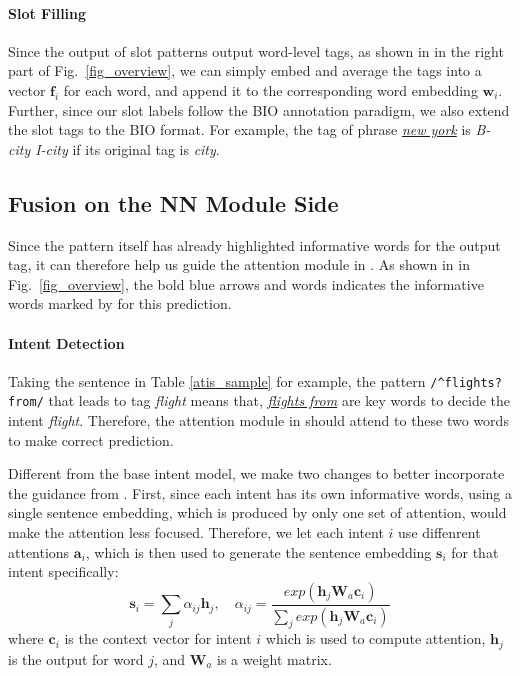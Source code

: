 \paragraph{Slot Filling}
Since the output of slot \RE patterns output word-level tags, as shown in  in the right part of Fig.~\ref{fig_overview}, we can simply embed and average the \RE tags into a vector $\textbf{f}_i$ for each word, and append it to the corresponding word embedding $\textbf{w}_i$. 
Further, since our slot labels follow the BIO annotation paradigm, we also extend the slot \RE tags to the BIO format. For example, the \RE tag of phrase \textsl{\underline{new york}} is \emph{B-city I-city} if its original tag is \emph{city}.

\subsection{Fusion on the NN Module Side}
\label{interact_with_module}
Since the \RE pattern itself has already highlighted informative words for the output tag, it can therefore help us guide the attention module in \NN.
As shown in  in Fig.~\ref{fig_overview}, the bold blue arrows and words indicates the informative words marked by \RE for this prediction.
\paragraph{Intent Detection}
Taking the sentence in Table \ref{atis_sample} for example, the pattern \texttt{/\textasciicircum flights?\:from/} that leads to tag \emph{flight} means that, \textsl{\underline{flights from}} are key words to decide the intent \emph{flight}. Therefore, the attention module in \NN should attend to these two words to make correct prediction. 

Different from the base intent model, we make two changes to better incorporate the guidance from \RE.
First, since each intent has its own informative words, using a single sentence embedding, which is produced by only one set of attention, would make the attention less focused. 
Therefore, we let each intent $i$ use diffenrent attentions $\textbf{a}_i$, which is then used to generate the sentence embedding $\textbf{s}_i$ for that intent specifically:
\begin{equation}
\textbf{s}_i = \sum_{j}{\alpha_{ij}\textbf{h}_j}, \quad
\alpha_{ij}=\frac{exp(\textbf{h}_j\textbf{W}_a\textbf{c}_i)}{\sum_{j}{exp(\textbf{h}_j\textbf{W}_a\textbf{c}_i)}}
\label{label_att_eq}
\end{equation}
where $\textbf{c}_i$ is the context vector for intent $i$ which is used to compute attention, $\textbf{h}_j$ is the \BLSTM output for word $j$, and $\textbf{W}_a$ is a weight matrix.

